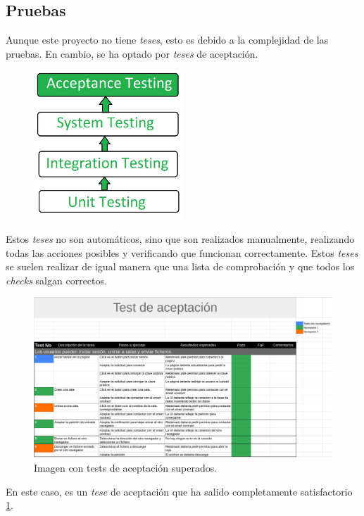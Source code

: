 \subsection{Pruebas}
Aunque este proyecto no tiene \textit{teses}, esto es debido a la complejidad de las pruebas. En cambio, se ha optado por \textit{teses} de aceptación.
\begin{figure}[h!]
    \centering
    \includegraphics[width=0.5\textwidth]{Figures/test.jpg}
    \cite{web:acceptance}
\end{figure}
Estos \textit{teses} no son automáticos, sino que son realizados manualmente, realizando todas las acciones posibles y verificando que funcionan correctamente. Estos \textit{teses} se suelen realizar de igual manera que una lista de comprobación y que todos los \textit{checks} salgan correctos.
\begin{figure}[h!]
    \centering
    \includegraphics[width=1\textwidth]{Figures/test-superado.png}
    \caption{Imagen con tests de aceptación superados.}
    \label{fg:test}
\end{figure}
En este caso, es un \textit{tese} de aceptación que ha salido completamente satisfactorio \ref{fg:test}.
